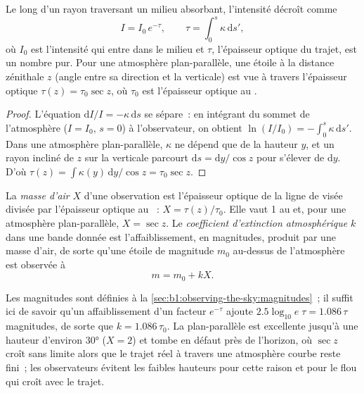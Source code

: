 \begin{proposition}\label{prop:b1:observing-the-sky:bouguer}
Le long d'un rayon traversant un milieu absorbant, l'intensité décroît comme
\[
  I = I_0\,e^{-\tau}, \qquad \tau = \int_0^s \kappa\,\mathrm ds' ,
\]
où $I_0$ est l'intensité qui entre dans le milieu et $\tau$, l'épaisseur
optique du trajet, est un nombre pur.
Pour une atmosphère plan-parallèle, une étoile à la distance zénithale $z$
(angle entre sa direction et la verticale) est vue à travers l'épaisseur
optique $\tau(z) = \tau_0\sec z$, où $\tau_0$ est l'épaisseur optique au
.
\end{proposition}

\begin{proof}
L'équation $\mathrm dI/I = -\kappa\,\mathrm ds$ se sépare~: en intégrant du
sommet de l'atmosphère ($I = I_0$, $s = 0$) à l'observateur, on obtient
$\ln(I/I_0) = -\int_0^s\kappa\,\mathrm ds'$. Dans une atmosphère plan-parallèle,
$\kappa$ ne dépend que de la hauteur $y$, et un rayon incliné de $z$ sur la
verticale parcourt $\mathrm ds = \mathrm dy/\cos z$ pour s'élever de
$\mathrm dy$. D'où
$\tau(z) = \int \kappa(y)\,\mathrm dy/\cos z = \tau_0\sec z$.
\end{proof}

\begin{definition}\label{def:b1:observing-the-sky:extinction}
La \emph{masse d'air} $X$ d'une observation est l'épaisseur
optique de la ligne de visée divisée par l'épaisseur optique au ~:
$X = \tau(z)/\tau_0$. Elle vaut 1 au  et, pour une atmosphère
plan-parallèle, $X = \sec z$. Le \emph{coefficient d'extinction
atmosphérique} $k$ dans une bande donnée est l'affaiblissement, en
magnitudes, produit par une masse d'air, de sorte qu'une étoile de magnitude
$m_0$ au-dessus de l'atmosphère est observée à
\[
  m = m_0 + kX .
\]
\end{definition}

Les magnitudes sont définies à la \cref{sec:b1:observing-the-sky:magnitudes}~;
il suffit ici de savoir qu'un affaiblissement d'un facteur $e^{-\tau}$ ajoute
$2.5\log_{10}e\;\tau = 1.086\,\tau$ magnitudes, de sorte que $k = 1.086\,\tau_0$.
La  plan-parallèle est excellente jusqu'à une hauteur d'environ
\ang{30} ($X = 2$) et tombe en défaut près de l'horizon, où $\sec z$ croît sans
limite alors que le trajet réel à travers une atmosphère courbe reste fini~;
les observateurs évitent les faibles hauteurs pour cette raison et pour le flou
qui croît avec le trajet.

